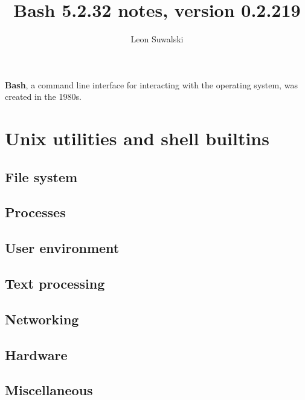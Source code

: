 \documentclass{charun}
\title{Bash 5.2.32 notes, version 0.2.219}
\author{Leon Suwalski}
\begin{document}
\begin{multicols*}{3}
\maketitle
\raggedright

\textbf{Bash}, a command line interface for interacting with the operating system, was created in the 1980s.










\newpage
\section{Unix utilities and shell builtins}
\subsection{File system}


\subsection{Processes}


\subsection{User environment}


\subsection{Text processing}


\subsection{Networking}


\subsection{Hardware}


\subsection{Miscellaneous}


\end{multicols*}
\end{document}
